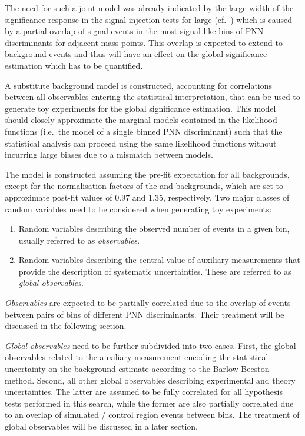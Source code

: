 The need for such a joint model was already indicated by the large width of the
significance response in the signal injection tests for large \mX
(cf.~) which is caused by a partial overlap of
signal events in the most signal-like bins of PNN discriminants for adjacent
mass points. This overlap is expected to extend to background events and thus
will have an effect on the global significance estimation which has to be
quantified.

A substitute background model is constructed, accounting for correlations
between all observables entering the statistical interpretation, that can be
used to generate toy experiments for the global significance estimation. This
model should closely approximate the marginal models contained in the likelihood
functions (i.e.\ the model of a single binned PNN discriminant) such that the
statistical analysis can proceed using the same likelihood functions without
incurring large biases due to a mismatch between models.

The model is constructed assuming the pre-fit expectation for all backgrounds,
except for the normalisation factors of the \ttbar and \ZHF backgrounds, which
are set to approximate post-fit values of 0.97 and 1.35, respectively. Two major
classes of random variables need to be considered when generating toy
experiments:
\begin{enumerate}
\item Random variables describing the observed number of events in a given bin,
  usually referred to as \emph{observables}.

\item Random variables describing the central value of auxiliary measurements
  that provide the description of systematic uncertainties. These are referred
  to as \emph{global observables}.
\end{enumerate}

\emph{Observables} are expected to be partially correlated due to the overlap of
events between pairs of bins of different PNN discriminants. Their treatment
will be discussed in the following section.

\emph{Global observables} need to be further subdivided into two cases. First,
the global observables related to the auxiliary measurement encoding the
statistical uncertainty on the background
estimate %
according to the Barlow-Beeston method. Second, all other global observables
describing experimental and theory uncertainties. The latter are assumed to be
fully correlated for all hypothesis tests performed in this search, while the
former are also partially correlated due to an overlap of simulated / control
region events between bins. The treatment of global observables will be
discussed in a later section.

